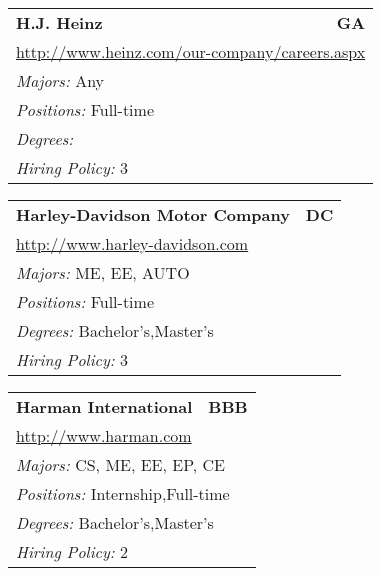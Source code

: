 \documentclass[twoside]{article}
\begin{document}
\begin{center}
\begin{multicols}{3}
\begin{FlushLeft}
\begin{minipage}{.9\columnwidth}
\end{minipage}
 
\begin{minipage}{.9\columnwidth}\begin{tabularx}{.95\columnwidth}{Xr}
                 {\Large\bf H.J. Heinz} & {\Large\bf GA}\\
    \multicolumn{2}{p{.95\columnwidth}}{\url{http://www.heinz.com/our-company/careers.aspx}}\\
    \multicolumn{2}{p{.95\columnwidth}}{\emph{Majors:} Any}\\
    \multicolumn{2}{p{.95\columnwidth}}{\emph{Positions:} Full-time}\\
    \multicolumn{2}{p{.95\columnwidth}}{\emph{Degrees:} }\\
    \multicolumn{2}{p{.95\columnwidth}}{\emph{Hiring Policy:} 3}\\
    \end{tabularx}
    
\end{minipage}
 
\begin{minipage}{.9\columnwidth}\begin{tabularx}{.95\columnwidth}{Xr}
                 {\Large\bf Harley-Davidson Motor Company} & {\Large\bf DC}\\
    \multicolumn{2}{p{.95\columnwidth}}{\url{http://www.harley-davidson.com}}\\
    \multicolumn{2}{p{.95\columnwidth}}{\emph{Majors:} ME, EE, AUTO}\\
    \multicolumn{2}{p{.95\columnwidth}}{\emph{Positions:} Full-time}\\
    \multicolumn{2}{p{.95\columnwidth}}{\emph{Degrees:} Bachelor's,Master's}\\
    \multicolumn{2}{p{.95\columnwidth}}{\emph{Hiring Policy:} 3}\\
    \end{tabularx}
    
\end{minipage}
 
\begin{minipage}{.9\columnwidth}\begin{tabularx}{.95\columnwidth}{Xr}
                 {\Large\bf Harman International} & {\Large\bf BBB}\\
    \multicolumn{2}{p{.95\columnwidth}}{\url{http://www.harman.com}}\\
    \multicolumn{2}{p{.95\columnwidth}}{\emph{Majors:} CS, ME, EE, EP, CE}\\
    \multicolumn{2}{p{.95\columnwidth}}{\emph{Positions:} Internship,Full-time}\\
    \multicolumn{2}{p{.95\columnwidth}}{\emph{Degrees:} Bachelor's,Master's}\\
    \multicolumn{2}{p{.95\columnwidth}}{\emph{Hiring Policy:} 2}\\
    \end{tabularx}
    

\end{minipage}
\end{FlushLeft}
\end{multicols}
\end{center}
\end{document}
